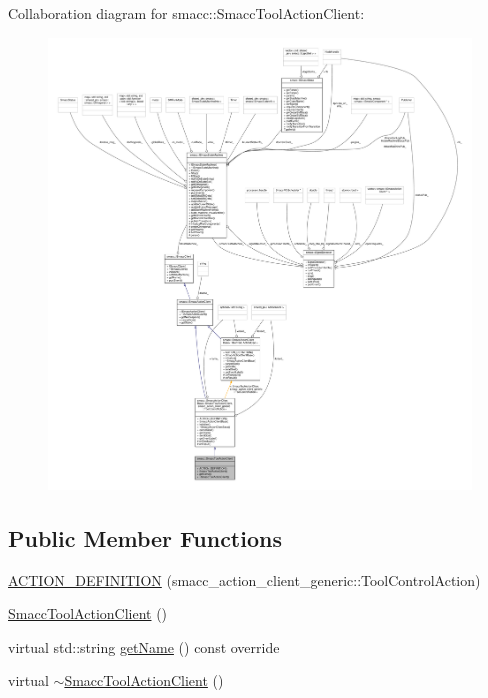 Collaboration diagram for smacc\+:\+:Smacc\+Tool\+Action\+Client\+:
\nopagebreak
\begin{figure}[H]
\begin{center}
\leavevmode
\includegraphics[width=350pt]{classsmacc_1_1SmaccToolActionClient__coll__graph}
\end{center}
\end{figure}
\subsection*{Public Member Functions}
\begin{DoxyCompactItemize}
\item 
\hyperlink{classsmacc_1_1SmaccToolActionClient_a319e87ff314694533ed6e89aeba55c5c}{A\+C\+T\+I\+O\+N\+\_\+\+D\+E\+F\+I\+N\+I\+T\+I\+ON} (smacc\+\_\+action\+\_\+client\+\_\+generic\+::\+Tool\+Control\+Action)
\item 
\hyperlink{classsmacc_1_1SmaccToolActionClient_aaee72ed9efa31a889d6fa66aa204a5c1}{Smacc\+Tool\+Action\+Client} ()
\item 
virtual std\+::string \hyperlink{classsmacc_1_1SmaccToolActionClient_a07ee35b66e8e8e28c9e39052835515c9}{get\+Name} () const override
\item 
virtual \hyperlink{classsmacc_1_1SmaccToolActionClient_a5795339a373ad22bc77b21970503ad91}{$\sim$\+Smacc\+Tool\+Action\+Client} ()
\end{DoxyCompactItemize}
